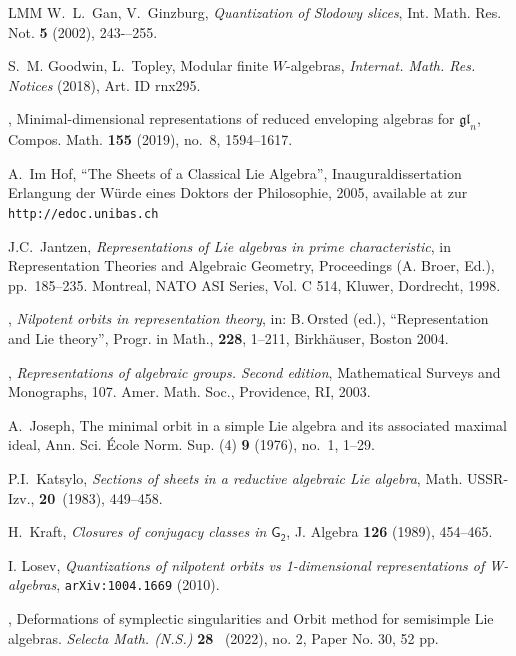 \documentclass[twoside,12pt,reqno]{amsart}
\theoremstyle{remark}
\numberwithin{equation}{section}
\newcommand{\arxiv}[1]{{\tt arXiv:#1}}
\def\sG{{\mathsf{G_2}}}
\begin{document}
\begin{thebibliography}{LMM}
         W.~L.~Gan, V.~Ginzburg, {\em Quantization of Slodowy slices}, Int. Math. Res. Not. {\bf 5}
(2002), 243-–255.


          S.~M. Goodwin, L.~Topley,
Modular finite $W$-algebras,
{\it Internat. Math. Res. Notices} (2018), Art.
ID rnx295.

        \bysame, Minimal-dimensional representations of reduced enveloping algebras for $\mathfrak{gl}_n$, Compos. Math. {\bf 155} (2019), no.~8, 1594--1617.

        {A.~Im Hof}, ``The Sheets of a Classical Lie Algebra'', Inauguraldissertation
        Erlangung der W\"urde eines Doktors der Philosophie, 2005, available at
        zur
        {\tt http://edoc.unibas.ch}
		
		J.C.~Jantzen, {\em  Representations of Lie algebras in prime characteristic}, in Representation
		Theories and Algebraic Geometry, Proceedings (A. Broer, Ed.), pp.\ 185--235. Montreal,
		NATO ASI Series, Vol. C 514, Kluwer, Dordrecht, 1998.
		
		\bysame, {\em Nilpotent orbits in representation theory}, in:
		B.\,Orsted (ed.), ``Representation and Lie theory'', Progr. in
		Math., {\bf 228}, 1--211, Birkh\"auser, Boston 2004.

    
         \bysame, {\em Representations of algebraic groups. Second edition}, Mathematical Surveys and Monographs, 107. Amer. Math. Soc., Providence, RI, 2003.

         A.~Joseph, The minimal orbit in a simple Lie algebra and its associated maximal ideal, Ann. Sci. \'Ecole Norm. Sup. (4) {\bf 9} (1976), no.~1, 1--29.

    

     P.I.~Katsylo, {\em Sections of sheets in a reductive algebraic Lie algebra}, Math. USSR-Izv., {\bf
20}\, (1983), 449--458.

     H.~Kraft, {\em Closures of conjugacy classes in $\sG$}, J. Algebra {\bf 126} (1989), 454--465.
    


     I. Losev, {\em Quantizations of nilpotent orbits vs 1-dimensional representations of W-algebras}, \arxiv{1004.1669} (2010).

     \bysame,
Deformations of symplectic singularities and Orbit method for semisimple Lie algebras.
{\it Selecta Math. (N.S.)} {\bf 28} \ (2022), no. 2, Paper No. 30, 52 pp.


\end{thebibliography}
\end{document}

